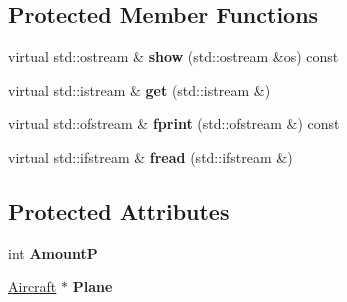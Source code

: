 \subsection*{Protected Member Functions}
\begin{DoxyCompactItemize}
\item 
\mbox{\label{class_aircraft_carrier_group_1_1_carrier_a39c9209efcee88accaa52f78f0e27b15}} 
virtual std\+::ostream \& {\bfseries show} (std\+::ostream \&os) const
\item 
\mbox{\label{class_aircraft_carrier_group_1_1_carrier_a46a590f1d91764b992bd3ba38c1f7491}} 
virtual std\+::istream \& {\bfseries get} (std\+::istream \&)
\item 
\mbox{\label{class_aircraft_carrier_group_1_1_carrier_a33df44dd96c25a3a8d6a6bbf0e3cb5c7}} 
virtual std\+::ofstream \& {\bfseries fprint} (std\+::ofstream \&) const
\item 
\mbox{\label{class_aircraft_carrier_group_1_1_carrier_a3ba78774821b750009f80b54074f1512}} 
virtual std\+::ifstream \& {\bfseries fread} (std\+::ifstream \&)
\end{DoxyCompactItemize}
\subsection*{Protected Attributes}
\begin{DoxyCompactItemize}
\item 
\mbox{\label{class_aircraft_carrier_group_1_1_carrier_a480a6c273c2bf1b2306bebb827694f79}} 
int {\bfseries AmountP}
\item 
\mbox{\label{class_aircraft_carrier_group_1_1_carrier_ada6d8bb865fbb1c75345c3cf1eb9a55b}} 
\mbox{\hyperlink{class_aircraft_carrier_group_1_1_aircraft}{Aircraft}} $\ast$ {\bfseries Plane}
\end{DoxyCompactItemize}
